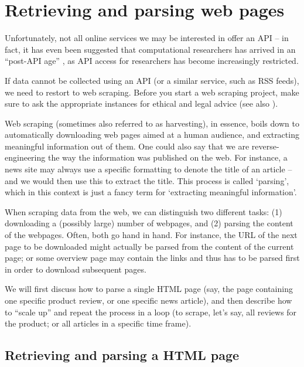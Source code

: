 \section{Retrieving and parsing web pages}
\label{sec:webpages}

Unfortunately, not all online services we may be interested in offer
an API -- in fact, it has even been suggested that computational
researchers has arrived in an ``post-API age'' \citep{Freelon2018}, as
API access for researchers has become increasingly restricted.

If data cannot be collected using an API (or a similar service, such
as RSS feeds), we need to restort to web scraping. Before you start a
web scraping project, make sure to ask the appropriate instances for
ethical and legal advice (see also ).

Web scraping (sometimes also referred to as harvesting), in essence,
boils down to automatically downloading web pages aimed at a human
audience, and extracting meaningful information out of them. One could
also say that we are reverse-engineering the way the information was
published on the web. For instance, a news site may always use a
specific formatting to denote the title of an article -- and we would
then use this to extract the title. This process is called `parsing',
which in this context is just a fancy term for `extracting meaningful
information'.

When scraping data from the web, we can distinguish two different
tasks: (1) downloading a (possibly large) number of webpages, and (2)
parsing the content of the webpages. Often, both go hand in
hand. For instance, the URL of the next page to be downloaded might
actually be parsed from the content of the current page; or some
overview page may contain the links and thus has to be parsed first in
order to download subsequent pages.

We will first discuss how to parse a single HTML page (say, the page
containing one specific product review, or one specific news article),
and then describe how to ``scale up'' and repeat the process in a
loop (to scrape, let's say, all reviews for the product; or all
articles in a specific time frame).




\subsection{Retrieving and parsing a HTML page}

